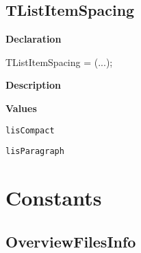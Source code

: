 \documentclass{report}
\newif\ifpdf
\begin{document}
\subsection*{TListItemSpacing}
\fi
\label{PasDoc_Gen-TListItemSpacing}
\begin{list}{}{
\setlength{\itemindent}{0cm}
\setlength{\listparindent}{0cm}
\setlength{\leftmargin}{\evensidemargin}
\addtolength{\leftmargin}{\tmplength}
\settowidth{\labelsep}{X}
\addtolength{\leftmargin}{\labelsep}
\setlength{\labelwidth}{\tmplength}
}
\item[\textbf{Declaration}\hfill]
\ifpdf
\begin{flushleft}
\fi
\begin{ttfamily}
TListItemSpacing = (...);\end{ttfamily}

\ifpdf
\end{flushleft}
\fi

\par
\item[\textbf{Description}]
 \item[\textbf{Values}]
\begin{description}
\item[\texttt{lisCompact}] \label{PasDoc_Gen-lisCompact}
\index{}
 
\item[\texttt{lisParagraph}] \label{PasDoc_Gen-lisParagraph}
\index{}
 
\end{description}


\end{list}
\section{Constants}
\ifpdf
\subsection*{\large{\textbf{OverviewFilesInfo}}\normalsize\hspace{1ex}\hrulefill}
\else
\end{document}
